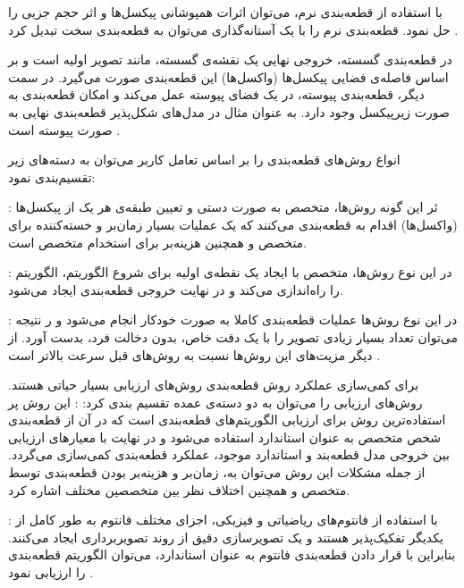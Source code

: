 با استفاده از قطعه‌بندی نرم، می‌توان اثرات همپوشانی پیکسل‌ها و اثر حجم جزیی را حل نمود. قطعه‌بندی نرم را با یک آستانه‌گذاری می‌توان به قطعه‌بندی سخت تبدیل کرد .

در قطعه‌بندی گسسته، خروجی نهایی یک نقشه‌ی گسسته، مانند تصویر اولیه است و بر اساس فاصله‌ی فضایی پیکسل‌ها (واکسل‌ها) این قطعه‌بندی صورت می‌گیرد. در سمت دیگر، قطعه‌بندی پیوسته، در یک فضای پیوسته عمل می‌کند و امکان قطعه‌بندی به صورت زیرپیکسل وجود دارد. به عنوان مثال در مدل‌های شکل‌پذیر قطعه‌بندی نهایی به صورت پیوسته است .

انواع روش‌های قطعه‌بندی را بر اساس تعامل کاربر می‌توان به دسته‌های زیر تقسیم‌بندی نمود:
 
 : ئر این گونه روش‌ها، متخصص به صورت دستی و تعیین طبقه‌ی هر یک از پیکسل‌ها (واکسل‌ها) اقدام به قطعه‌بندی می‌کنند که یک عملیات بسیار زمان‌بر و خسته‌کننده برای متخصص و همچنین هزینه‌بر برای استخدام متخصص است.

 : در این نوع روش‌ها، متخصص با ایجاد یک نقطه‌ی اولیه برای شروع الگوریتم، الگوریتم را راه‌اندازی می‌کند و در نهایت خروجی قطعه‌بندی ایجاد می‌شود. 

 : در این نوع روش‌ها عملیات قطعه‌بندی کاملا به‌ صورت خودکار انجام می‌شود و ر نتیجه می‌توان تعداد بسیار زیادی تصویر را با یک دقت خاص، بدون دخالت فرد، بدست آورد. از دیگر مزیت‌های این روش‌ها نسبت به روش‌های قبل سرعت بالاتر است .


برای کمی‌سازی عملکرد روش قطعه‌بندی روش‌های ارزیابی بسیار حیاتی هستند. روش‌های ارزیابی را می‌توان به دو دسته‌ی عمده تقسیم بندی کرد: 
 : این روش پر استفاده‌ترین روش برای ارزیابی الگوریتم‌های قطعه‌بندی است که در آن از قطعه‌بندی شخص متخصص به عنوان استاندارد استفاده می‌شود و در نهایت با معیارهای ارزیابی بین خروجی مدل قطعه‌بند و استاندارد موجود، عملکرد قطعه‌بندی کمی‌سازی می‌گردد. از جمله مشکلات این روش می‌توان به، زمان‌بر و هزینه‌بر بودن قطعه‌بندی توسط متخصص و همچنین اختلاف نظر بین متخصصین مختلف اشاره کرد.

 : با استفاده از فانتوم‌های ریاضیاتی و فیزیکی، اجزای مختلف فانتوم به طور کامل از یکدیگر تفکیک‌پذیر هستند و یک تصویرسازی دقیق از روند تصویربرداری ایجاد می‌کنند. بنابراین با قرار دادن قطعه‌بندی فانتوم به عنوان استاندارد، می‌توان الگوریتم قطعه‌بندی را ارزیابی نمود .

